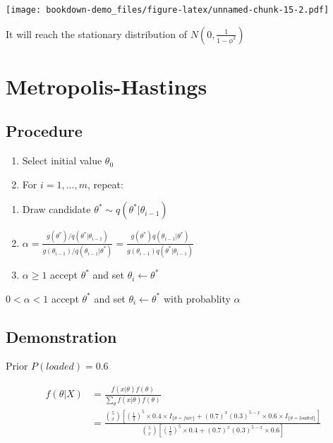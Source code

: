 \documentclass[
]{book}
\begin{document}
\texttt{[image: bookdown-demo\_files/figure-latex/unnamed-chunk-15-2.pdf]}

It will reach the stationary distribution of \(N(0, \frac{1}{1-\phi^2})\)

\hypertarget{metropolis-hastings}{%
\section{Metropolis-Hastings}\label{metropolis-hastings}}

\hypertarget{procedure}{%
\subsection{Procedure}\label{procedure}}

\begin{enumerate}
\def\labelenumi{(\arabic{enumi})}
\item
  Select initial value \(\theta_0\)
\item
  For \(i=1,..., m\), repeat:
\end{enumerate}

\begin{enumerate}
\def\labelenumi{(\alph{enumi})}
\item
  Draw candidate \(\theta^* \sim q(\theta^*|\theta_{i-1})\)
\item
  \(\alpha=\frac{g(\theta^*)/q(\theta^*|\theta_{i-1})}{g(\theta_{i-1})/q(\theta_{i-1}|\theta^*)}=\frac{g(\theta^*)q(\theta_{i-1}|\theta^*)}{g(\theta_{i-1})q(\theta^*|\theta_{i-1})}\)
\item
  \(\alpha \geq 1\) accept \(\theta^*\) and set \(\theta_i \leftarrow \theta^*\)
\end{enumerate}

\(0<\alpha < 1\) accept \(\theta^*\) and set \(\theta_i \leftarrow \theta^*\) with probablity \(\alpha\)

\hypertarget{demonstration}{%
\subsection{Demonstration}\label{demonstration}}

Prior \(P(loaded)=0.6\)

\[\begin{aligned} f(\theta | X) &= \frac{f(x|\theta) f(\theta)}{\sum_{\theta} f(x|\theta)f(\theta)} \\ &=\frac{\binom{5}{x} [(\frac{1}{2})^5 \times 0.4 \times I_{\{\theta=fair \}}+ (0.7)^x(0.3)^{5-x} \times 0.6 \times I_{\{\theta=loaded \}}]}{\binom{5}{x} [(\frac{1}{2})^5 \times 0.4 + (0.7)^x(0.3)^{5-x} \times 0.6]}  \end{aligned}\]
\end{document}
